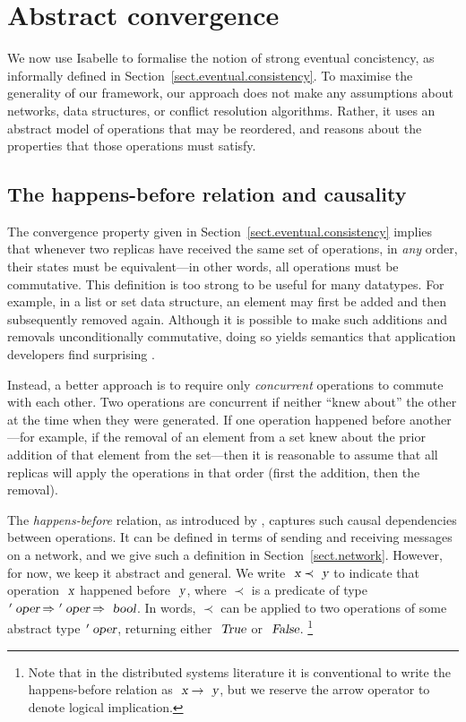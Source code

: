\section{Abstract convergence}
\label{sect.abstract.convergence}

We now use Isabelle to formalise the notion of strong eventual concistency, as informally defined in Section~\ref{sect.eventual.consistency}.
To maximise the generality of our framework, our approach does not make any assumptions about networks, data structures, or conflict resolution algorithms.
Rather, it uses an abstract model of operations that may be reordered, and reasons about the properties that those operations must satisfy.

\subsection{The happens-before relation and causality}\label{sect.happens.before}

The convergence property given in Section~\ref{sect.eventual.consistency} implies that whenever two replicas have received the same set of operations, in \emph{any} order, their states must be equivalent---in other words, all operations must be commutative.
This definition is too strong to be useful for many datatypes.
For example, in a list or set data structure, an element may first be added and then subsequently removed again.
Although it is possible to make such additions and removals unconditionally commutative, doing so yields semantics that application developers find surprising \cite{Bieniusa:2012wu,Bieniusa:2012gt}.

Instead, a better approach is to require only \emph{concurrent} operations to commute with each other.
Two operations are concurrent if neither ``knew about'' the other at the time when they were generated.
If one operation happened before another---for example, if the removal of an element from a set knew about the prior addition of that element from the set---then it is reasonable to assume that all replicas will apply the operations in that order (first the addition, then the removal).

The \emph{happens-before} relation, as introduced by \citet{Lamport:1978jq}, captures such causal dependencies between operations.
It can be defined in terms of sending and receiving messages on a network, and we give such a definition in Section~\ref{sect.network}.
However, for now, we keep it abstract and general.
We write $\isa{x} \prec \isa{y}$ to indicate that operation $\isa{x}$ happened before $\isa{y}$, where $\prec$ is a predicate of type $\isacharprime\isa{oper} \mathbin{\isasymRightarrow} \isacharprime\isa{oper} \mathbin{\isasymRightarrow} \isa{bool}$.
In words, $\prec$ can be applied to two operations of some abstract type $\isacharprime\isa{oper}$, returning either $\isa{True}$ or $\isa{False}$.%
\footnote{Note that in the distributed systems literature it is conventional to write the happens-before relation as $\isa{x} \rightarrow \isa{y}$, but we reserve the arrow operator to denote logical implication.}

